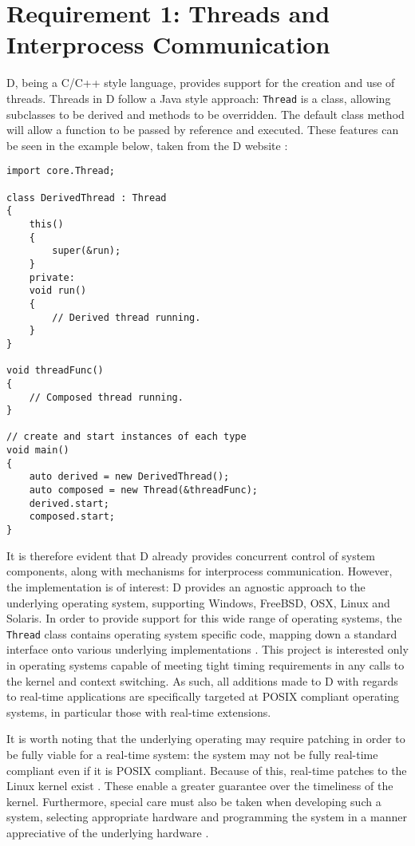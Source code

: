 \section{Requirement 1: Threads and Interprocess Communication}
D, being a C/C++ style language, provides support for the creation and use of 
threads. Threads in D follow a Java style approach: \texttt{Thread} is a class, 
allowing subclasses to be derived and methods to be overridden. The default 
class method will allow a function to be passed by reference and executed. 
These features can be seen in the example below, taken from the D website
\cite{core-thread}: 
\begin{lstlisting}[basicstyle=\small]
import core.Thread; 

class DerivedThread : Thread
{
    this()
    {
        super(&run);
    }
    private:
    void run()
    {
        // Derived thread running.
    }
}

void threadFunc()
{
    // Composed thread running.
}

// create and start instances of each type
void main()
{
    auto derived = new DerivedThread();
    auto composed = new Thread(&threadFunc);
    derived.start; 
    composed.start;
}
\end{lstlisting}
It is therefore evident that D already provides 
concurrent control of system components, along with mechanisms for 
interprocess communication. However, the implementation is of interest: D 
provides an agnostic approach to the underlying operating system, supporting 
Windows, FreeBSD, OSX, Linux and Solaris. 
In order to provide support for this wide range of operating systems, the 
\texttt{Thread}
class contains operating system specific code, mapping down a standard interface 
onto various underlying implementations 
\cite{github-core-thread}. 
This project is interested only in operating systems capable of meeting tight timing 
requirements in any calls to the kernel and context switching.
As such, all additions made to D with regards to real-time applications are 
specifically targeted at POSIX compliant 
operating systems, in particular those with real-time extensions. 
\par\bigskip\noindent
It is worth noting that the underlying operating may require patching in order 
to be fully viable for a real-time system: the system may not be fully
real-time compliant even if it is POSIX compliant. Because of this, real-time patches 
to the Linux kernel exist \cite{rt-wiki}. These enable a greater 
guarantee over the timeliness of the kernel. 
Furthermore, special care must also be taken when developing such a system,
selecting appropriate hardware and programming the system in a manner appreciative 
of the underlying hardware \cite{rt-wiki-how-to}.

